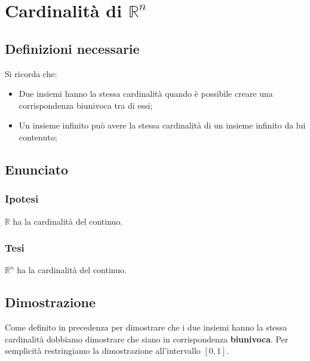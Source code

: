 \documentclass[../dimostrazioni]{subfiles}
\begin{document}
    \chapter{Cardinalità \texorpdfstring{di \(\mathbb{R}^n\)}{del continuo}}

        \section*{Definizioni necessarie}

            Si ricorda che:

            \begin{itemize}
                \item Due insiemi hanno la stessa cardinalità quando è possibile creare una corrispondenza biunivoca tra di essi;
                \item Un insieme infinito può avere la stessa cardinalità di un insieme infinito da lui contenuto;
            \end{itemize}

        \section*{Enunciato}

            \subsection*{Ipotesi}

            \( \mathbb{R} \) ha la cardinalità del continuo.

            \subsection*{Tesi}

            \( \mathbb{R}^n \) ha la cardinalità del continuo.                

        \section*{Dimostrazione}

            Come definito in precedenza per dimostrare che i due insiemi hanno la stessa cardinalità 
            dobbiamo dimostrare che siano in corrispondenza \textbf{biunivoca}. 
            Per semplicità restringiamo la dimostrazione all'intervallo \([0, 1]\).
            
\end{document}
